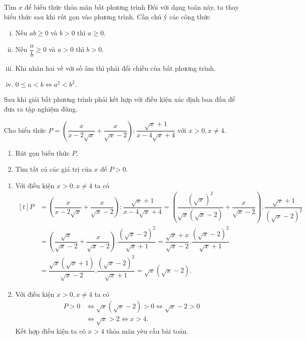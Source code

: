 \begin{dang}{Tìm $x$ để biểu thức thỏa mãn bất phương trình}
	Đối với dạng toán này, ta thay biểu thức sau khi rút gọn vào phương trình.
	Cần chú ý các công thức
	\begin{enumerate}[i)]
		\item Nếu $ab\geq 0$ và $b>0$ thì $a\geq 0.$
		\item Nếu $\dfrac{a}{b}\geq 0$ và $a>0$ thì $b>0.$
		\item Khi nhân hai vế với số âm thì phải đổi chiều của bất phương trình.
		\item  $0\leq a<b \Leftrightarrow a^2<b^2.$
	\end{enumerate}
	\begin{note}
		Sau khi giải bất phương trình phải kết hợp với điều kiện xác định ban đầu để đưa ra tập nghiệm đúng.
	\end{note}
\end{dang}
\begin{vd}
	Cho biểu thức $P=\left(\dfrac{x}{x-2\sqrt{x}}+\dfrac{x}{\sqrt{x}-2}\right):\dfrac{\sqrt{x}+1}{x-4\sqrt{x}+4}$ với $x>0,x\ne 4$.
	\begin{enumerate}    
		\item Rút gọn biểu thức $P$.
		\item Tìm tất cả các giá trị của $x$ để $P>0$.
	\end{enumerate}
	\loigiai
	{
		\begin{enumerate}
			\item Với điều kiện $x>0,x\ne 4$ ta có \\
			$
			\begin{aligned}[t]
			P&=\left(\dfrac{x}{x-2\sqrt{x}}+\dfrac{x}{\sqrt{x}-2}\right):\dfrac{\sqrt{x}+1}{x-4\sqrt{x}+4}
			=\left(\dfrac{\left(\sqrt{x}\right)^2}{\sqrt{x}\left(\sqrt{x}-2\right)}+\dfrac{x}{\sqrt{x}-2}\right):\dfrac{\sqrt{x}+1}{\left(\sqrt{x}-2\right)^2}\\
			&=\left(\dfrac{\sqrt{x}}{\sqrt{x}-2}+\dfrac{x}{\sqrt{x}-2}\right).\dfrac{\left(\sqrt{x}-2\right)^2}{\sqrt{x}+1}
			=\dfrac{\sqrt{x}+x}{\sqrt{x}-2}.\dfrac{\left(\sqrt{x}-2\right)^2}{\sqrt{x}+1}\\
			&=\dfrac{\sqrt{x}\left(\sqrt{x}+1\right)}{\sqrt{x}-2}.\dfrac{\left(\sqrt{x}-2\right)^2}{\sqrt{x}+1}=\sqrt{x}\left(\sqrt{x}-2\right).
			\end{aligned}
			$
			\item Với điều kiện $x>0,x\ne 4$ ta có
			\begin{align*}
			P>0&\Leftrightarrow\sqrt{x}\left(\sqrt{x}-2\right)>0\Leftrightarrow \sqrt{x}-2>0\\
			&\Leftrightarrow \sqrt{x}>2\Leftrightarrow x>4.
			\end{align*}
			Kết hợp điều kiện ta có $x>4$ thỏa mãn yêu cầu bài toán.
		\end{enumerate}
	}
\end{vd}

